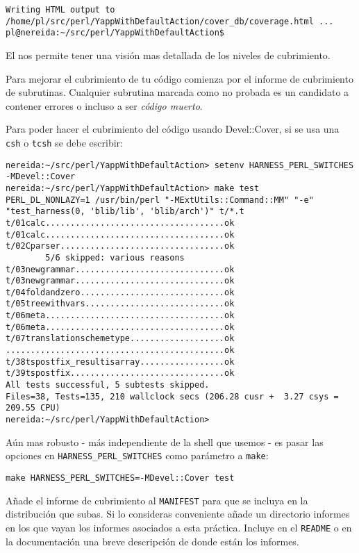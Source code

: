 \begin{enumerate}
\begin{verbatim}
Writing HTML output to /home/pl/src/perl/YappWithDefaultAction/cover_db/coverage.html ...
pl@nereida:~/src/perl/YappWithDefaultAction$          
\end{verbatim}
El 
nos permite tener una visión mas detallada de los niveles
de cubrimiento.

Para mejorar el cubrimiento de tu código comienza por el informe de
cubrimiento de subrutinas. Cualquier subrutina marcada como
no probada es un candidato a contener errores o incluso a ser {\it código
muerto}.

Para poder hacer el cubrimiento del código usando Devel::Cover, si se usa una \verb|csh| 
o \verb|tcsh| se debe escribir:

\begin{verbatim}
nereida:~/src/perl/YappWithDefaultAction> setenv HARNESS_PERL_SWITCHES -MDevel::Cover
nereida:~/src/perl/YappWithDefaultAction> make test
PERL_DL_NONLAZY=1 /usr/bin/perl "-MExtUtils::Command::MM" "-e" "test_harness(0, 'blib/lib', 'blib/arch')" t/*.t
t/01calc....................................ok 
t/01calc....................................ok
t/02Cparser.................................ok
        5/6 skipped: various reasons
t/03newgrammar..............................ok 
t/03newgrammar..............................ok
t/04foldandzero.............................ok
t/05treewithvars............................ok
t/06meta....................................ok 
t/06meta....................................ok
t/07translationschemetype...................ok
............................................ok
t/38tspostfix_resultisarray.................ok
t/39tspostfix...............................ok 
All tests successful, 5 subtests skipped.
Files=38, Tests=135, 210 wallclock secs (206.28 cusr +  3.27 csys = 209.55 CPU)
nereida:~/src/perl/YappWithDefaultAction>
\end{verbatim}
Aún mas robusto - más independiente de la shell que usemos - es pasar las opciones en
\verb|HARNESS_PERL_SWITCHES| como parámetro a \verb|make|:
\begin{verbatim}
make HARNESS_PERL_SWITCHES=-MDevel::Cover test
\end{verbatim}

Añade el informe de cubrimiento al \verb|MANIFEST| para que se incluya en la distribución 
que subas. Si lo consideras conveniente añade un directorio informes en los que vayan los informes asociados
a esta práctica. Incluye en el \verb|README| o en la documentación una breve descripción
de donde están los informes.


\end{enumerate}
